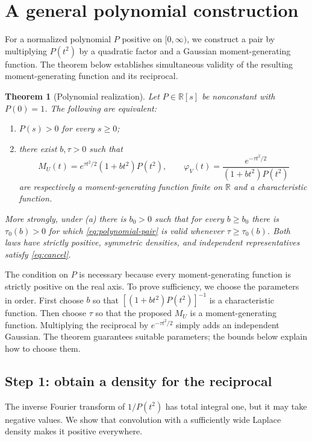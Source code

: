 \documentclass[11pt,twoside]{article}
\theoremstyle{journalplain}
\numberwithin{equation}{section}
\newtheorem{theorem}{Theorem}[section]
\theoremstyle{journaldefinition}
\newcommand{\R}{\mathbb R}
\begin{document}
\section{A general polynomial construction}\label{sec:polynomial}
For a normalized polynomial $P$ positive on $[0,\infty)$, we construct a pair by multiplying $P(t^2)$ by a quadratic factor and a Gaussian moment-generating function. The theorem below establishes simultaneous validity of the resulting moment-generating function and its reciprocal.

\begin{theorem}[Polynomial realization]\label{thm:polynomial}
Let $P\in\R[s]$ be nonconstant with $P(0)=1$. The following are equivalent:
\begin{enumerate}[label=(\alph*)]
\item $P(s)>0$ for every $s\ge0$;
\item there exist $b,\tau>0$ such that
\begin{equation}\label{eq:polynomial-pair}
 M_U(t)=e^{\tau t^2/2}(1+bt^2)P(t^2),\qquad
 \varphi_V(t)=\frac{e^{-\tau t^2/2}}{(1+bt^2)P(t^2)}
\end{equation}
are respectively a moment-generating function finite on $\R$ and a characteristic function.
\end{enumerate}
More strongly, under (a) there is $b_0>0$ such that for every $b\ge b_0$ there is $\tau_0(b)>0$ for which \eqref{eq:polynomial-pair} is valid whenever $\tau\ge\tau_0(b)$. Both laws have strictly positive, symmetric densities, and independent representatives satisfy \eqref{eq:cancel}.
\end{theorem}
The condition on $P$ is necessary because every moment-generating function is strictly positive on the real axis. To prove sufficiency, we choose the parameters in order. First choose $b$ so that $[(1+bt^2)P(t^2)]^{-1}$ is a characteristic function. Then choose $\tau$ so that the proposed $M_U$ is a moment-generating function. Multiplying the reciprocal by $e^{-\tau t^2/2}$ simply adds an independent Gaussian. The theorem guarantees suitable parameters; the bounds below explain how to choose them.

\subsection{Step 1: obtain a density for the reciprocal}
The inverse Fourier transform of $1/P(t^2)$ has total integral one, but it may take negative values. We show that convolution with a sufficiently wide Laplace density makes it positive everywhere.
\end{document}
